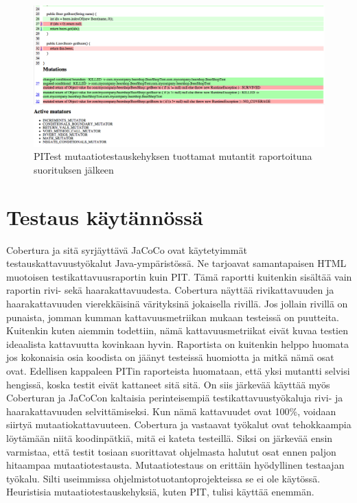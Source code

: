 \documentclass[finnish]{tktltiki2}
\begin{document}
\begin{figure}[here]
\centering
\caption{PITest mutaatiotestauskehyksen tuottamat mutantit raportoituna suorituksen jälkeen}
\label{fig:mutantit}
\includegraphics[scale=0.4]{freimarikuvat/mutantit.png}
\end{figure}

\section{Testaus käytännössä}
Cobertura ja sitä syrjäyttävä JaCoCo ovat käytetyimmät testauskattavuustyökalut Java-ympäristössä. Ne tarjoavat samantapaisen HTML muotoisen testikattavuusraportin kuin PIT. Tämä raportti kuitenkin sisältää vain raportin rivi- sekä haarakattavuudesta. Cobertura näyttää rivikattavuuden ja haarakattavuuden vierekkäisinä värityksinä jokaisella rivillä. Jos jollain rivillä on punaista, jomman kumman kattavuusmetriikan mukaan testeissä on puutteita. Kuitenkin kuten aiemmin todettiin, nämä kattavuusmetriikat eivät kuvaa testien ideaalista kattavuutta kovinkaan hyvin. Raportista on kuitenkin helppo huomata jos kokonaisia osia koodista on jäänyt testeissä huomiotta ja mitkä nämä osat ovat. Edellisen kappaleen PITin raporteista huomataan, että yksi mutantti selvisi hengissä, koska testit eivät kattaneet sitä sitä. On siis järkevää käyttää myös Coberturan ja JaCoCon kaltaisia perinteisempiä testikattavuustyökaluja rivi- ja haarakattavuuden selvittämiseksi. Kun nämä kattavuudet ovat 100\%, voidaan siirtyä mutaatiokattavuuteen. Cobertura ja vastaavat työkalut ovat tehokkaampia löytämään niitä koodinpätkiä, mitä ei kateta testeillä. Siksi on järkevää ensin varmistaa, että testit tosiaan suorittavat ohjelmasta halutut osat ennen paljon hitaampaa mutaatiotestausta. Mutaatiotestaus on erittäin hyödyllinen testaajan työkalu. Silti useimmissa ohjelmistotuotantoprojekteissa se ei ole käytössä. Heuristisia mutaatiotestauskehyksiä, kuten PIT, tulisi käyttää enemmän. 
\end{document}
